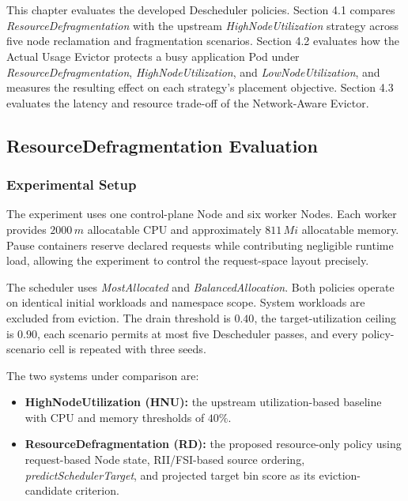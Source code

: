 \chapter{\babEmpat}
\label{bab:4}

This chapter evaluates the developed Descheduler policies. Section 4.1 compares \textit{ResourceDefragmentation} with the upstream \textit{HighNodeUtilization} strategy across five node reclamation and fragmentation scenarios. Section 4.2 evaluates how the Actual Usage Evictor protects a busy application Pod under \textit{ResourceDefragmentation}, \textit{HighNodeUtilization}, and \textit{LowNodeUtilization}, and measures the resulting effect on each strategy's placement objective. Section 4.3 evaluates the latency and resource trade-off of the Network-Aware Evictor.

\section{ResourceDefragmentation Evaluation}
\label{sec:resource_defrag_evaluation}

\subsection{Experimental Setup}
\label{sec:defrag_experimental_setup}

The experiment uses one control-plane Node and six worker Nodes. Each worker provides \(2000\,m\) allocatable CPU and approximately \(811\,Mi\) allocatable memory. Pause containers reserve declared requests while contributing negligible runtime load, allowing the experiment to control the request-space layout precisely.

The scheduler uses \textit{MostAllocated} and \textit{BalancedAllocation}. Both policies operate on identical initial workloads and namespace scope. System workloads are excluded from eviction. The drain threshold is \(0.40\), the target-utilization ceiling is \(0.90\), each scenario permits at most five Descheduler passes, and every policy-scenario cell is repeated with three seeds.

The two systems under comparison are:

\begin{itemize}
    \item \textbf{HighNodeUtilization (HNU):} the upstream utilization-based baseline with CPU and memory thresholds of \(40\%\).
    \item \textbf{ResourceDefragmentation (RD):} the proposed resource-only policy using request-based Node state, RII/FSI-based source ordering, \textit{predictSchedulerTarget}, and projected target bin score as its eviction-candidate criterion.
\end{itemize}

